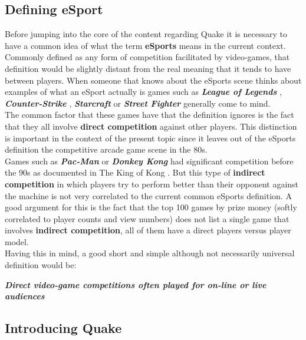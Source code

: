 \subsection{Defining eSport}

Before jumping into the core of the content regarding Quake it is necessary to have a common idea of what the term \textbf{eSports} means in the current context. Commonly defined as any form of competition facilitated by video-games, that definition would be slightly distant from the real meaning that it tends to have between players. When someone that knows about the eSports scene thinks about examples of what an eSport actually is games such as \textbf{\textit{League of Legends}} \citep{game:league}, \textit{\textbf{Counter-Strike}} \citep{game:cs}, \textbf{\textit{Starcraft}} \citep{game:starcraft} or \textit{\textbf{Street Fighter}} \citep{game:streetfighter} generally come to mind.\\

The common factor that these games have that the definition ignores is the fact that they all involve \textbf{direct competition} against other players. This distinction is important in the context of the present topic since it leaves out of the eSports definition the competitive arcade game scene in the 80s.\\

Games such as \textbf{\textit{Pac-Man}} \citep{game:pacman} or \textbf{\textit{Donkey Kong}} \citep{game:donkeykong} had significant competition before the 90s as documented in The King of Kong \citep{kingKong}. But this type of \textbf{indirect competition} in which players try to perform better than their opponent against the machine is not very correlated to the current common eSports definition. A good argument for this is the fact that the top 100 games by prize money \citep{biggestEsports} (softly correlated to player counts and view numbers) does not list a single game that involves \textbf{indirect competition}, all of them have a direct players versus player model.\\

Having this in mind, a good short and simple although not necessarily universal definition would be:\\

\begin{center}
\textbf{\textit{Direct video-game competitions often played for on-line or live audiences}}
\end{center}

\subsection{Introducing Quake}

